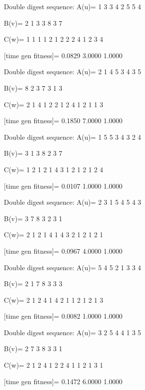 Double digest sequence:
A(u)=
     1     3     3     4     2     5     5     4

B(v)=
     2     1     3     3     8     3     7

C(w)=
     1     1     1     1     2     1     2     2     2     4     1     2     3     4

[time gen fitness]=
    0.0829    3.0000    1.0000

Double digest sequence:
A(u)=
     2     1     4     5     3     4     3     5

B(v)=
     8     2     3     7     3     1     3

C(w)=
     2     1     4     1     2     2     1     2     4     1     2     1     1     3

[time gen fitness]=
    0.1850    7.0000    1.0000

Double digest sequence:
A(u)=
     1     5     5     3     4     3     2     4

B(v)=
     3     1     3     8     2     3     7

C(w)=
     1     2     1     2     1     4     3     1     2     1     2     1     2     4

[time gen fitness]=
    0.0107    1.0000    1.0000

Double digest sequence:
A(u)=
     2     3     1     5     4     5     4     3

B(v)=
     3     7     8     3     2     3     1

C(w)=
     2     1     2     1     4     1     4     3     2     1     2     1     2     1

[time gen fitness]=
    0.0967    4.0000    1.0000

Double digest sequence:
A(u)=
     5     4     5     2     1     3     3     4

B(v)=
     2     1     7     8     3     3     3

C(w)=
     2     1     2     4     1     4     2     1     1     2     1     2     1     3

[time gen fitness]=
    0.0082    1.0000    1.0000

Double digest sequence:
A(u)=
     3     2     5     4     4     1     3     5

B(v)=
     2     7     3     8     3     3     1

C(w)=
     2     1     2     4     1     2     2     4     1     1     2     1     3     1

[time gen fitness]=
    0.1472    6.0000    1.0000

